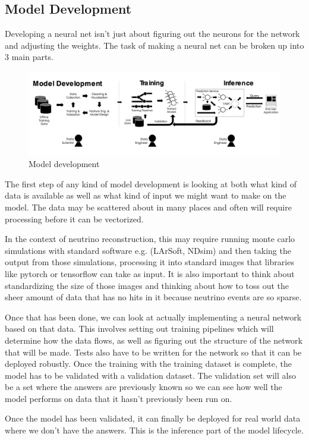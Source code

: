 \subsection{Model Development}

Developing a neural net isn't just about figuring out the neurons for the network and adjusting the weights.
The task of making a neural net can be broken up into 3 main parts.

\begin{figure}[H]
\centering
\includegraphics[width=120mm]{figures/mlLifecycle.png}
\caption{Model development}
\label{lifecycle}
\end{figure}

The first step of any kind of model development is looking at both what kind of data is available as well as what kind of input we might want to make on the model.
The data may be scattered about in many places and often will require processing before it can be vectorized.

In the context of neutrino reconstruction, this may require running monte carlo simulations with standard software e.g. (LArSoft, NDsim) and then taking the output from those simulations, processing it into standard images that libraries like pytorch or tensorflow can take as input.
It is also important to think about standardizing the size of those images and thinking about how to toss out the sheer amount of data that has no hits in it because neutrino events are so sparse.

Once that has been done, we can look at actually implementing a neural network based on that data.
This involves setting out training pipelines which will determine how the data flows, as well as figuring out the structure of the network that will be made.
Tests also have to be written for the network so that it can be deployed robustly.
Once the training with the training dataset is complete, the model has to be validated with a validation dataset.
The validation set will also be a set where the answers are previously known so we can see how well the model performs on data that it hasn't previously been run on.

Once the model has been validated, it can finally be deployed for real world data where we don't have the answers.
This is the inference part of the model lifecycle.

